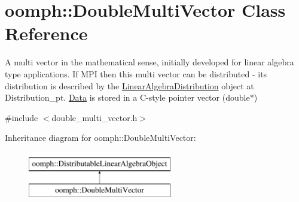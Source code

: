 \hypertarget{classoomph_1_1DoubleMultiVector}{}\section{oomph\+:\+:Double\+Multi\+Vector Class Reference}
\label{classoomph_1_1DoubleMultiVector}


A multi vector in the mathematical sense, initially developed for linear algebra type applications. If M\+PI then this multi vector can be distributed -\/ its distribution is described by the \hyperlink{classoomph_1_1LinearAlgebraDistribution}{Linear\+Algebra\+Distribution} object at Distribution\+\_\+pt. \hyperlink{classoomph_1_1Data}{Data} is stored in a C-\/style pointer vector (double$\ast$)  




{\ttfamily \#include $<$double\+\_\+multi\+\_\+vector.\+h$>$}

Inheritance diagram for oomph\+:\+:Double\+Multi\+Vector\+:\begin{figure}[H]
\begin{center}
\leavevmode
\includegraphics[height=2.000000cm]{classoomph_1_1DoubleMultiVector}
\end{center}
\end{figure}
